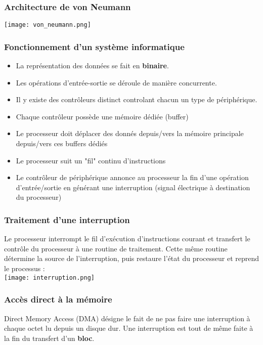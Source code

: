 \documentclass{article}
\begin{document}
        \subsubsection{Architecture de von Neumann}
            \texttt{[image: von\_neumann.png]}
        
        \subsubsection{Fonctionnement d'un système informatique}
            \begin{itemize}
                \item La représentation des données se fait en \textbf{binaire}.
                \item Les opérations d'entrée-sortie se déroule de manière concurrente.
                \item Il y existe des contrôleurs distinct controlant chacun un type de périphérique.
                \item Chaque contrôleur possède une mémoire dédiée (buffer)
                \item Le processeur doit déplacer des donnés depuis/vers la
                mémoire principale depuis/vers ces buffers dédiés
                \item Le processeur suit un "fil" continu d’instructions
                \item Le contrôleur de périphérique annonce au
                processeur la fin d’une opération d’entrée/sortie en
                générant une interruption (signal électrique à destination du processeur)
            \end{itemize}

        \subsubsection{Traitement d'une interruption}
            Le processeur interrompt le fil d’exécution d’instructions courant et
            transfert le contrôle du processeur à une routine de traitement.
            Cette même routine détermine la source de l'interruption, puis restaure l'état du processeur
            et reprend le processus :\\
            \texttt{[image: interruption.png]}

        \subsubsection{Accès direct à la mémoire}
            Direct Memory Access (DMA) désigne le fait de ne pas faire une interruption à chaque octet lu depuis un disque dur.
            Une interruption est tout de même faite à la fin du transfert d'un \textbf{bloc}.
        
\end{document}
